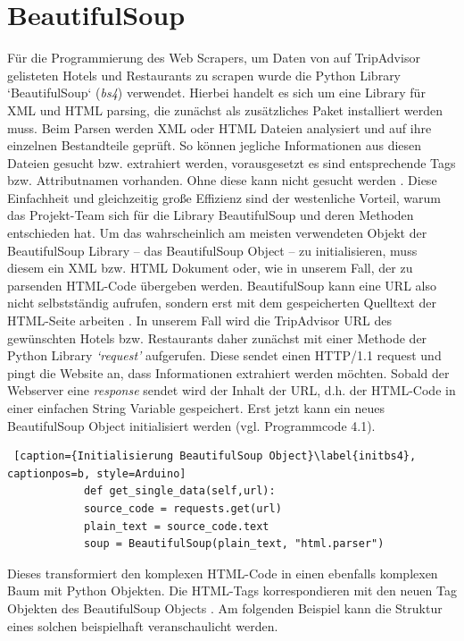 \documentclass[a4paper,oneside,12pt]{report}
\begin{document}
	
		\section{BeautifulSoup}
		
			Für die Programmierung des Web Scrapers, um Daten von auf TripAdvisor gelisteten Hotels und Restaurants zu scrapen wurde die Python Library ‘BeautifulSoup‘ (\textit{bs4}) verwendet.
			\newline
			Hierbei handelt es sich um eine Library für XML und HTML parsing, die zunächst als zusätzliches Paket installiert werden muss. Beim Parsen werden XML oder HTML Dateien analysiert und auf ihre einzelnen Bestandteile geprüft. So können jegliche Informationen aus diesen Dateien gesucht bzw. extrahiert werden, vorausgesetzt es sind entsprechende Tags bzw. Attributnamen vorhanden. Ohne diese kann nicht gesucht werden \cite{bib-webpython}. Diese Einfachheit und gleichzeitig große Effizienz sind der westenliche Vorteil, warum das Projekt-Team sich für die Library BeautifulSoup und deren Methoden entschieden hat.
			\newline
			Um das wahrscheinlich am meisten verwendeten Objekt der BeautifulSoup Library – das BeautifulSoup Object – zu initialisieren, muss diesem ein XML bzw. HTML Dokument oder, wie in unserem Fall, der zu parsenden HTML-Code übergeben werden. BeautifulSoup kann eine URL also nicht selbstständig aufrufen, sondern erst mit dem gespeicherten Quelltext der HTML-Seite arbeiten \cite{bib-bs4}. In unserem Fall wird die TripAdvisor URL des gewünschten Hotels bzw. Restaurants daher zunächst mit einer Methode der Python Library \textit{‘request'} aufgerufen. Diese sendet einen HTTP/1.1 request und pingt die Website an, dass Informationen extrahiert werden möchten. Sobald der Webserver eine \textit{response} sendet wird der Inhalt der URL, d.h. der HTML-Code in einer einfachen String Variable gespeichert. Erst jetzt kann ein neues BeautifulSoup Object initialisiert werden (vgl. Programmcode 4.1).
			\begin{lstlisting} [caption={Initialisierung BeautifulSoup Object}\label{initbs4}, captionpos=b, style=Arduino]
			def get_single_data(self,url):
			source_code = requests.get(url)
			plain_text = source_code.text
			soup = BeautifulSoup(plain_text, "html.parser")
			\end{lstlisting}
			
			Dieses transformiert den komplexen HTML-Code in einen ebenfalls komplexen Baum mit Python Objekten. Die HTML-Tags korrespondieren mit den neuen Tag Objekten des BeautifulSoup Objects \cite{bib-bs4}. Am folgenden Beispiel kann die Struktur eines solchen beispielhaft veranschaulicht werden.
			
\end{document}

